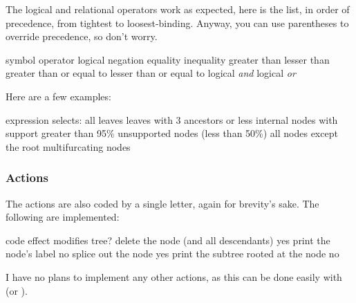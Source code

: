 The logical and relational operators work as expected, here is the list, in
order of precedence, from tightest to loosest-binding.  Anyway, you can use
parentheses to override precedence, so don't worry.

\startalignment[center]
	\starttabulate[|c|l|]
		\NC symbol 		\NC operator \NC\NR
		\HL
		\NC \code{!} 	\NC logical negation \NC\NR
		\HL
		\NC \code{==}	\NC equality \NC\NR
		\NC \code{!=} \NC inequality \NC\NR
		\NC \code{<} 	\NC greater than \NC\NR
		\NC \code{>} 	\NC lesser than \NC\NR
		\NC \code{>=} \NC greater than or equal to \NC\NR
		\NC \code{<=} \NC lesser than or equal to \NC\NR
		\HL
		\NC \code{\&} \NC logical {\em and} \NC\NR
		\HL
		\NC \code{\|} 	\NC logical {\em or} \NC\NR
	\stoptabulate
\stopalignment

Here are a few examples:

\startalignment[center]
	\starttabulate[|c|l|]
		\NC expression \NC selects: \NC\NR
		\HL
		\NC {} \NC all leaves \NC\NR
		\NC {} \NC leaves with 3 ancestors or less \NC\NR
		\NC {} \NC internal nodes with support greater than 95\% \NC\NR 
		\NC {} \NC unsupported nodes (less than 50\%) \NC\NR
		\NC {} \NC all nodes except the root \NC\NR
		\NC {} \NC multifurcating nodes \NC\NR
	\stoptabulate
\stopalignment

\subsubsection{Actions}

The actions are also coded by a single letter, again for brevity's sake. The
following are implemented:

\startalignment[center]
	\starttabulate[|c|l|c|]
		\NC code \NC effect \NC modifies tree?\NC\NR
		\HL
		\NC {} \NC delete the node (and all descendants) \NC yes \NC\NR
		\NC {} \NC print the node's label \NC no \NC\NR
		\NC {} \NC splice out the node \NC yes \NC\NR
		\NC {} \NC print the subtree rooted at the node \NC no \NC\NR
	\stoptabulate
\stopalignment

I have no plans to implement any other actions, as this can be done easily
with \luaed{} (or \sched).




\subsection{\sched}

